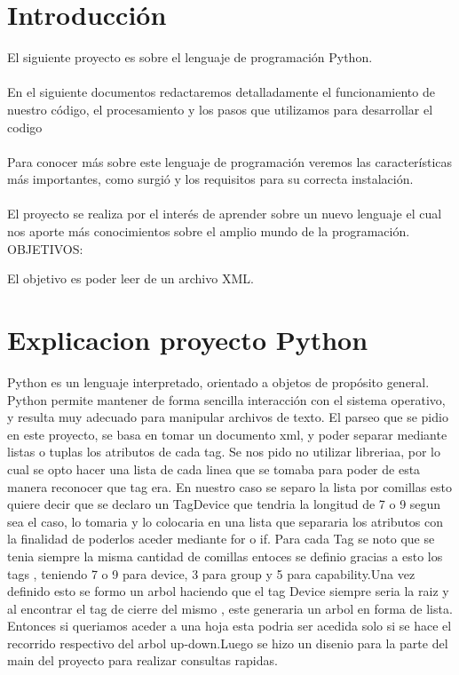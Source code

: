 \documentclass[14pt]{article} %
\begin{document}
\section{Introducción}
El siguiente proyecto es sobre el lenguaje de programación Python.\\ 
\\En el siguiente documentos redactaremos detalladamente el funcionamiento de nuestro código, el procesamiento y los pasos que utilizamos para desarrollar el codigo \\
\\Para conocer más sobre este lenguaje de programación veremos las características más importantes,  como surgió y los requisitos para su correcta instalación. \\
\\El proyecto se realiza por el interés de aprender sobre un nuevo lenguaje el cual nos aporte más conocimientos sobre el amplio mundo de la programación.\\






OBJETIVOS:

El objetivo es poder leer de un archivo XML.

\section{Explicacion proyecto Python}
Python es un lenguaje interpretado, orientado a objetos de propósito general. Python permite mantener de forma sencilla interacción con el sistema operativo, y resulta muy adecuado para manipular archivos de texto. 
El parseo que se pidio en este proyecto, se basa en tomar un documento xml, y poder separar mediante listas o tuplas los atributos de cada tag. Se nos pido no utilizar libreriaa, por lo cual se opto hacer una lista de cada linea que se tomaba para poder de esta manera reconocer que tag era. En nuestro caso se separo la lista por comillas esto quiere decir que se declaro un TagDevice que tendria la longitud de 7 o 9 segun sea el caso, lo tomaria y lo colocaria en una lista que separaria los atributos con la finalidad de poderlos aceder mediante for o if. Para cada Tag se noto que se tenia siempre la misma cantidad de comillas entoces se definio gracias a esto los tags , teniendo 7 o 9 para device, 3 para group y 5 para capability.Una vez definido esto se formo un arbol haciendo que el tag Device siempre seria la raiz y al encontrar el tag de cierre del mismo , este generaria un arbol en forma de lista. Entonces si queriamos aceder a una hoja esta podria ser acedida solo si se hace el recorrido respectivo del arbol up-down.Luego se hizo un disenio para la parte del main del proyecto para realizar consultas rapidas. 
\end{document}
